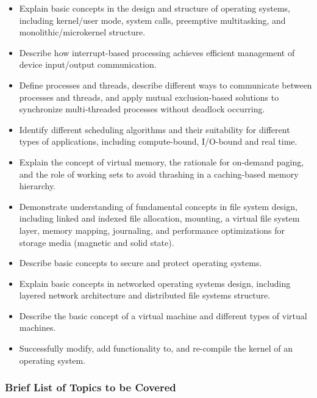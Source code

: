 {\begin{highlight}[\CSPBOS]
        \begin{itemize}
            \item Explain basic concepts in the design and structure of operating systems, including kernel/user mode, system calls, preemptive multitasking, and monolithic/microkernel structure.
            \item Describe how interrupt-based processing achieves efficient management of device input/output communication.
            \item Define processes and threads, describe different ways to communicate between processes and threads, and apply mutual exclusion-based solutions to synchronize multi-threaded processes without deadlock occurring.
            \item Identify different scheduling algorithms and their suitability for different types of applications, including compute-bound, I/O-bound and real time.
            \item Explain the concept of virtual memory, the rationale for on-demand paging, and the role of working sets to avoid thrashing in a caching-based memory hierarchy.
            \item Demonstrate understanding of fundamental concepts in file system design, including linked and indexed file allocation, mounting, a virtual file system layer, memory mapping, journaling, and performance optimizations for storage media (magnetic and solid state).
            \item Describe basic concepts to secure and protect operating systems.
            \item Explain basic concepts in networked operating systems design, including layered network architecture and distributed file systems structure.
            \item Describe the basic concept of a virtual machine and different types of virtual machines.
            \item Successfully modify, add functionality to, and re-compile the kernel of an operating system.
        \end{itemize}
        
        \subsubsection*{Brief List of Topics to be Covered}
    

\end{highlight}}

